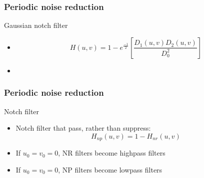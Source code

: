 \documentclass{beamer}
\begin{document}
\begin{frame}
\frametitle{Periodic noise reduction}
\begin{block}{Gaussian notch filter}
\begin{itemize}
\item[]
	\[
 	H(u,v) = 1 - e^\frac{-1}{2}\left[\frac{D_{1}(u,v)D_{2}(u,v)}{D_{0}^2}\right]
  	\]
\item[]
\end{itemize}
\end{block}
\end{frame}
\begin{frame}
\frametitle{Periodic noise reduction}
\begin{block}{Notch filter}
\begin{itemize}
\item Notch filter that pass, rather than suppress: 
$$ H_{np}(u,v) = 1 - H_{nr}(u,v)$$
\item If $u_{0} = v_{0} = 0$,  NR filters become highpass filters
\item If $u_{0} = v_{0} = 0$,  NP filters become lowpass filters
\end{itemize}
\end{block}
\end{frame}
\end{document}
